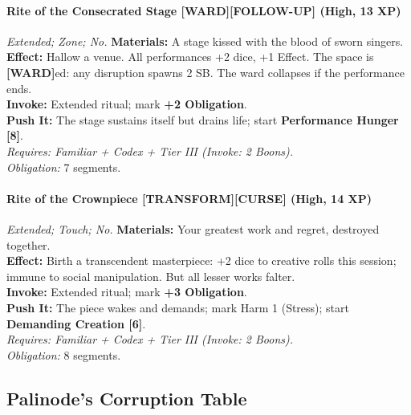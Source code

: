 \paragraph{Rite of the Consecrated Stage [WARD][FOLLOW-UP] (High, 13 XP)} \emph{Extended; Zone; No.}
\textbf{Materials:} A stage kissed with the blood of sworn singers.\\
\textbf{Effect:} Hallow a venue. All performances +2 dice, +1 Effect. The space is \textbf{[WARD]}ed: any disruption spawns 2 SB. The ward collapses if the performance ends.\\
\textbf{Invoke:} Extended ritual; mark \textbf{+2 Obligation}.\\
\textbf{Push It:} The stage sustains itself but drains life; start \textbf{Performance Hunger [8]}.\\
\emph{Requires: Familiar + Codex + Tier III (\textit{Invoke:} 2 Boons).}\\
\emph{Obligation:} 7 segments.

\paragraph{Rite of the Crownpiece [TRANSFORM][CURSE] (High, 14 XP)} \emph{Extended; Touch; No.}
\textbf{Materials:} Your greatest work and regret, destroyed together.\\
\textbf{Effect:} Birth a transcendent masterpiece: +2 dice to creative rolls this session; immune to social manipulation. But all lesser works falter.\\
\textbf{Invoke:} Extended ritual; mark \textbf{+3 Obligation}.\\
\textbf{Push It:} The piece wakes and demands; mark Harm 1 (Stress); start \textbf{Demanding Creation [6]}.\\
\emph{Requires: Familiar + Codex + Tier III (\textit{Invoke:} 2 Boons).}\\
\emph{Obligation:} 8 segments.

\subsection*{Palinode’s Corruption Table}
\label{sec:palinode-corruption}

